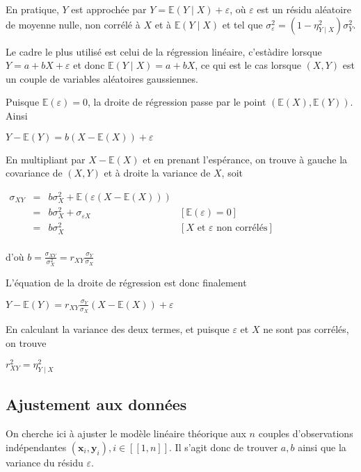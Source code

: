 \documentclass[letterpaper,10pt,english]{jupyterBook}
\begin{document}
\sphinxAtStartPar
En pratique, \(Y\) est approchée par \(Y=\mathbb{E}(Y\mid X)+\varepsilon\), où \(\varepsilon\) est un résidu aléatoire de moyenne nulle, non corrélé à \(X\) et à \(\mathbb{E}(Y\mid X)\) et tel que \(\sigma_\varepsilon^2= (1-\eta_{Y\mid X}^2)\sigma_Y^2\).

\sphinxAtStartPar
Le cadre le plus utilisé est celui de la régression linéaire, c’est\sphinxhyphen{}à\sphinxhyphen{}dire lorsque \(Y=a+bX+\varepsilon\) et donc \(\mathbb{E}(Y\mid X)=a+bX\), ce qui est le cas lorsque \((X,Y)\) est un couple de variables aléatoires gaussiennes.

\sphinxAtStartPar
Puisque \(\mathbb{E}(\varepsilon)=0\), la droite de régression passe par le point \((\mathbb{E}(X),\mathbb{E}(Y))\). Ainsi

\sphinxAtStartPar
\(Y-\mathbb{E}(Y)=b(X-\mathbb{E}(X))+\varepsilon\)

\sphinxAtStartPar
En multipliant par \(X-\mathbb{E}(X)\) et en prenant l’espérance, on trouve à gauche la covariance de \((X,Y)\) et à droite la variance de \(X\), soit

\sphinxAtStartPar
\(\begin{array}{ccll}
\sigma_{XY}&=& b\sigma_X^2+\mathbb{E}(\varepsilon(X-\mathbb{E}(X)))&\\
&=& b\sigma_X^2 + \sigma_{\varepsilon X}&[\mathbb{E}(\varepsilon)=0]\\ 
&=& b\sigma_X^2 &[X\text{ et } \varepsilon\text{ non corrélés}]\\ 
\end{array}
\)

\sphinxAtStartPar
d’où
\(b = \frac{\sigma_{XY}}{\sigma_X^2} = r_{XY}\frac{\sigma_Y}{\sigma_X}\)

\sphinxAtStartPar
L’équation de la droite de régression est donc finalement

\sphinxAtStartPar
\(Y-\mathbb{E}(Y)=r_{XY}\frac{\sigma_Y}{\sigma_X}(X-\mathbb{E}(X))+\varepsilon\)

\sphinxAtStartPar
En calculant la variance des deux termes, et puisque \(\varepsilon\) et \(X\) ne sont pas corrélés, on trouve

\sphinxAtStartPar
\(r_{XY}^2 = \eta_{Y\mid X}^2\)


\subsection{Ajustement aux données}
\label{\detokenize{regression:ajustement-aux-donnees}}
\sphinxAtStartPar
On cherche ici à ajuster le modèle linéaire théorique aux \(n\) couples d’observations indépendantes \((\mathbf x_i,\mathbf y_i),i\in[\![1,n]\!]\). Il s’agit donc de trouver \(a,b\) ainsi que la variance du résidu \(\varepsilon\).
\end{document}
